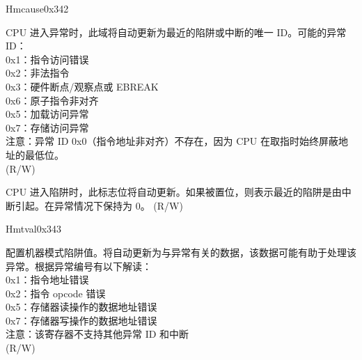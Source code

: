 \begin{register}{H}{mcause}{0x342}\label{regdesc:LPMCAUSE}
%
%
%
\regnewline%
\begin{regdesc}\begin{reglist}
\label{fielddesc:LPMCAUSECODE}\item [Exception Code] CPU 进入异常时，此域将自动更新为最近的陷阱或中断的唯一 ID。可能的异常 ID：\\
0x1：指令访问错误\\
0x2：非法指令\\
0x3：硬件断点/观察点或 EBREAK\\
0x6：原子指令非对齐\\
0x5：加载访问异常\\
0x7：存储访问异常\\
注意：异常 ID 0x0（指令地址非对齐）不存在，因为 CPU 在取指时始终屏蔽地址的最低位。\\
(R/W)
\label{fielddesc:LPMCAUSEINT}\item [Interrupt Flag] CPU 进入陷阱时，此标志位将自动更新。如果被置位，则表示最近的陷阱是由中断引起。在异常情况下保持为 0。 (R/W)
\end{reglist}\end{regdesc}
\end{register}

\begin{register}{H}{mtval}{0x343}\label{regdesc:LPMTVAL}
%
\regnewline%
\begin{regdesc}\begin{reglist}
\label{fielddesc:LPMTVAL}\item [MTVAL] 配置机器模式陷阱值。将自动更新为与异常有关的数据，该数据可能有助于处理该异常。根据异常编号有以下解读：\\
0x1：指令地址错误\\
0x2：指令 opcode 错误\\
0x5：存储器读操作的数据地址错误\\
0x7：存储器写操作的数据地址错误\\
注意：该寄存器不支持其他异常 ID 和中断\\
(R/W)
\end{reglist}\end{regdesc}
\end{register}



